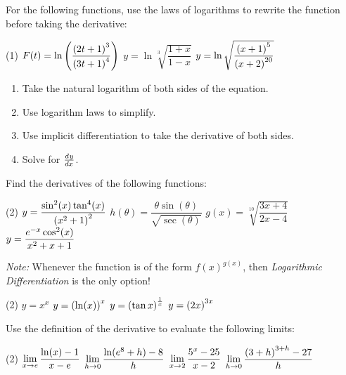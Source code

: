 \documentclass[../mathNotesPreamble]{subfiles}
\begin{document}
  \begin{ex*}
    For the following functions, use the laws of logarithms to rewrite the function before taking the derivative:
  \end{ex*}
  
  \noindent
  \begin{tasks}[after-item-skip=\stretch{1}, label=~](1)
    \task $F(t)=\ln\parens{\dfrac{\parens{2t+1}^3}{\parens{3t+1}^4}}$
    \task $y=\ln\sqrt[3]{\dfrac{1+x}{1-x}}$
    \task $y=\ln\sqrt{\dfrac{\parens{x+1}^5}{\parens{x+2}^{20}}}$
  \end{tasks}
  \pagebreak

  \begin{thmBox*}
    \begin{enumerate}
      \item Take the natural logarithm of both sides of the equation.
      \item Use logarithm laws to simplify.
      \item Use implicit differentiation to take the derivative of both sides.
      \item Solve for $\dydx$.
    \end{enumerate}
  \end{thmBox*}

  \begin{ex*}
    Find the derivatives of the following functions:
  \end{ex*}
  \begin{tasks}[after-item-skip=\stretch{1}, label=~](2)
    \task $y=\dfrac{\sin^2(x)\tan^4(x)}{\parens{x^2+1}^2}$
    \task $h(\theta)=\dfrac{\theta \sin(\theta)}{\sqrt{\sec(\theta)}}$
    \task $g(x)=\sqrt[10]{\dfrac{3x+4}{2x-4}}$
    \task $y=\dfrac{e\inv[x]\cos^2(x)}{x^2+x+1}$
  \end{tasks}
  \pagebreak
  
  \noindent
  \textit{Note:} Whenever the function is of the form $f(x)^{g(x)}$, then \textit{Logarithmic Differentiation} is the only option!
  \begin{tasks}[after-item-skip=\stretch{1}, label=~](2)
    \task $y=x^x$
    \task $y=\parens{\ln(x)}^x$
    \task $y=\parens{\tan x}^\frac{1}{x}$
    \task $y=\parens{2x}^{3x}$
  \end{tasks}
  \vfill 
  \pagebreak
  
  \begin{ex*}
    Use the definition of the derivative to evaluate the following limits:
  \end{ex*}
  \begin{tasks}[after-item-skip=\stretch{1}, label=~](2)
    \task $\ds\lim_{x\to e} \dfrac{\ln(x)-1}{x-e}$
    \task $\ds\lim_{h\to 0} \dfrac{\ln(e^8+h)-8}{h}$
    \task $\ds\lim_{x\to 2} \dfrac{5^x-25}{x-2}$
    \task $\ds\lim_{h\to 0} \dfrac{\parens{3+h}^{3+h}-27}{h}$
  \end{tasks}
  \vfill
  \pagebreak
  
\end{document}
